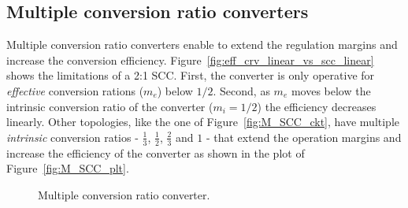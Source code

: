 \subsection{Multiple conversion ratio converters}
Multiple conversion ratio converters enable to extend the regulation margins and increase the conversion efficiency. Figure~\ref{fig:eff_crv_linear_vs_scc_linear} shows the limitations of a 2:1 SCC. First, the converter is only operative for \emph{effective} conversion rations ($m_e$) below $1/2$. Second, as $m_e$ moves below the intrinsic conversion ratio of the converter ($m_i=1/2$) the efficiency decreases linearly.
Other topologies, like the one of Figure~\ref{fig:M_SCC_ckt}, have multiple \emph{intrinsic} conversion ratios - $\frac{1}{3}$, $\frac{1}{2}$, $\frac{2}{3}$ and $1$ - that extend the operation margins and increase the efficiency of the converter as shown in the plot of Figure~\ref{fig:M_SCC_plt}.
\begin{figure}[!h]
    \centering
    \parbox[b]{.45\linewidth}{
            \raggedright
            
            \label{fig:M_SCC_ckt}
    }
    \hfill
    \parbox[b]{.45\linewidth}{
            \raggedleft
            
            \label{fig:M_SCC_plt}
    }
    \caption{Multiple conversion ratio converter.}
    \label{fig:M_SCC}
\end{figure}

